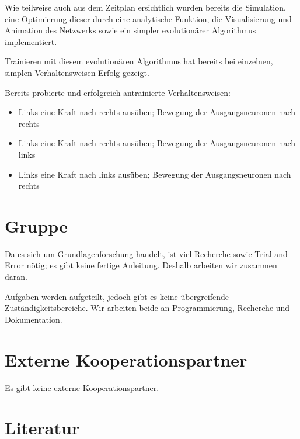 \documentclass[parskip]{scrartcl}
\begin{document}
Wie teilweise auch aus dem Zeitplan ersichtlich wurden bereits die Simulation, eine Optimierung dieser durch eine analytische Funktion, die Visualisierung und Animation des Netzwerks sowie ein simpler evolutionärer Algorithmus implementiert.

Trainieren mit diesem evolutionären Algorithmus hat bereits bei einzelnen, simplen Verhaltensweisen Erfolg gezeigt.

Bereits probierte und erfolgreich antrainierte Verhaltensweisen:

\begin{itemize}
    \item Links eine Kraft nach rechts ausüben; Bewegung der Ausgangsneuronen nach rechts 
    \item Links eine Kraft nach rechts ausüben; Bewegung der Ausgangsneuronen nach links
    \item Links eine Kraft nach links ausüben; Bewegung der Ausgangsneuronen nach rechts
\end{itemize}

\section{Gruppe}

Da es sich um Grundlagenforschung handelt, ist viel Recherche sowie Trial-and-Error nötig; es gibt keine fertige Anleitung.
Deshalb arbeiten wir zusammen daran.

Aufgaben werden aufgeteilt, jedoch gibt es keine übergreifende Zuständigkeitsbereiche. Wir arbeiten beide an Programmierung, Recherche und Dokumentation.

\section{Externe Kooperationspartner}

Es gibt keine externe Kooperationspartner.

\section{Literatur}

\printbibliography
\end{document}

